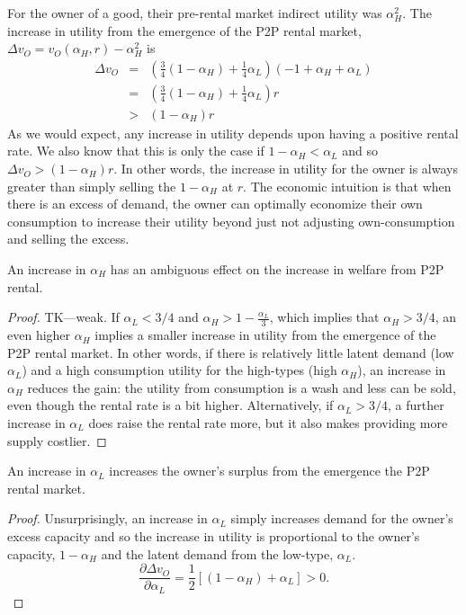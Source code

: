 \documentclass[11pt]{article}
\begin{document}
For the owner of a good, their pre-rental market indirect utility was $\alpha_H^2$. 
The increase in utility from the emergence of the P2P rental market, $\Delta v_O = v_O(\alpha_H, r) - \alpha_H^2$ is  
\begin{eqnarray} 
\Delta v_O &=& \left( \frac{3}{4} (1-\alpha_H) + \frac{1}{4} \alpha_L \right) (-1 + \alpha_H + \alpha_L)  \\
                 &=& \left( \frac{3}{4} (1-\alpha_H) + \frac{1}{4} \alpha_L \right) r   \\
                 &>& (1-\alpha_H)r 
\end{eqnarray} 
As we would expect, any increase in utility depends upon having a positive rental rate. 
We also know that this is only the case if $1- \alpha_H < \alpha_L$ and so $\Delta v_O > (1-\alpha_H)r$. 
In other words, the increase in utility for the owner is always greater than simply selling the $1-\alpha_H$ at $r$. 
The economic intuition is that when there is an excess of demand, the owner can optimally economize their own consumption to increase their utility beyond just not adjusting own-consumption and selling the excess.  

\begin{prop}
An increase in $\alpha_H$ has an ambiguous effect on the increase in welfare from P2P rental. 
\end{prop} 
\begin{proof}
TK---weak. 
If $\alpha_L < 3/4$ and $\alpha_H > 1 - \frac{\alpha_L}{3}$, which implies that $\alpha_H > 3/4$, an even higher $\alpha_H$ implies a smaller increase in utility from the emergence of the P2P rental market. 
In other words, if there is relatively little latent demand (low $\alpha_L$) and a high consumption utility for the high-types (high $\alpha_H$), an increase in $\alpha_H$ reduces the gain: 
the utility from consumption is a wash and less can be sold, even though the rental rate is a bit higher.
Alternatively, if $\alpha_L > 3/4$, a further increase in $\alpha_L$ does raise the rental rate more, but it also makes providing more supply costlier.  
\end{proof} 

\begin{prop}
An increase in $\alpha_L$ increases the owner's surplus from the emergence the P2P rental market. 
\end{prop} 
\begin{proof}
Unsurprisingly, an increase in $\alpha_L$ simply increases demand for the owner's excess capacity and so the increase in utility is proportional to the owner's capacity, $1-\alpha_H$ and the latent demand from the low-type, $\alpha_L$.  
\begin{equation}
\frac{\partial \Delta v_O}{\partial \alpha_L} = \frac{1}{2} \left[(1-\alpha_H) + \alpha_L \right] > 0.  
\end{equation} 
\end{proof} 
\end{document}
